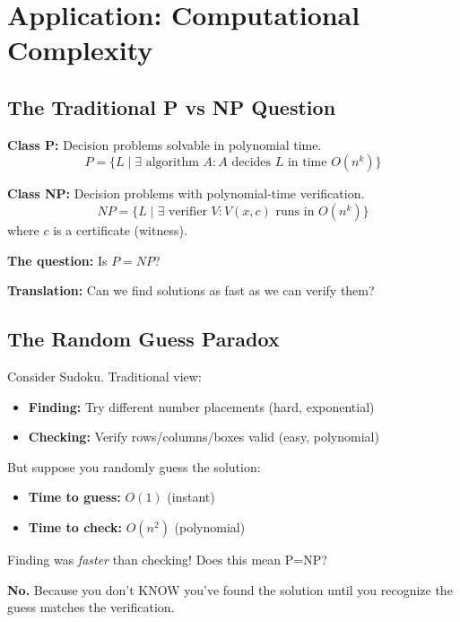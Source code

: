 \documentclass[twocolumn,10pt]{article}
\theoremstyle{definition}
\theoremstyle{remark}
\begin{document}
\section{Application: Computational Complexity}
\label{sec:complexity}

\subsection{The Traditional P vs NP Question}

\textbf{Class P:} Decision problems solvable in polynomial time.
\begin{equation}
P = \{L \mid \exists \text{ algorithm } A: A \text{ decides } L \text{ in time } O(n^k)\}
\end{equation}

\textbf{Class NP:} Decision problems with polynomial-time verification.
\begin{equation}
NP = \{L \mid \exists \text{ verifier } V: V(x, c) \text{ runs in } O(n^k)\}
\end{equation}
where $c$ is a certificate (witness).

\vspace{0.2cm}
\noindent\textbf{The question:} Is $P = NP$?

\textbf{Translation:} Can we find solutions as fast as we can verify them?

\subsection{The Random Guess Paradox}

Consider Sudoku. Traditional view:
\begin{itemize}
\item \textbf{Finding:} Try different number placements (hard, exponential)
\item \textbf{Checking:} Verify rows/columns/boxes valid (easy, polynomial)
\end{itemize}

But suppose you randomly guess the solution:
\begin{itemize}
\item \textbf{Time to guess:} $O(1)$ (instant)
\item \textbf{Time to check:} $O(n^2)$ (polynomial)
\end{itemize}

Finding was \textit{faster} than checking! Does this mean P=NP?

\vspace{0.2cm}
\noindent\textbf{No.} Because you don't KNOW you've found the solution until you recognize the guess matches the verification.
\end{document}

